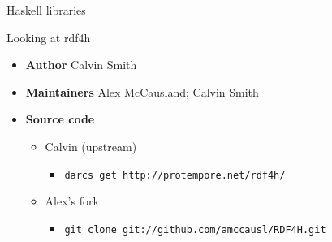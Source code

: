 \documentclass{beamer}
\begin{document}
\begin{frame}[fragile]

\huge
\begin{center}
Haskell libraries
\end{center}

\large
\begin{center}
Looking at rdf4h
\end{center}

\begin{itemize}
\item \textbf{Author} Calvin Smith
\item \textbf{Maintainers} Alex McCausland; Calvin Smith
\item \textbf{Source code}
  
  \begin{itemize}
  \item Calvin (upstream)
    
    \begin{itemize}
    \item \texttt{darcs get
      http://protempore.net/rdf4h/}
    \end{itemize}
    
  \item Alex's fork
    
    \begin{itemize}
    \item \texttt{git clone
      git://github.com/amccausl/RDF4H.git}
    \end{itemize}

  \end{itemize}

\end{itemize}

\end{frame}
\end{document}
